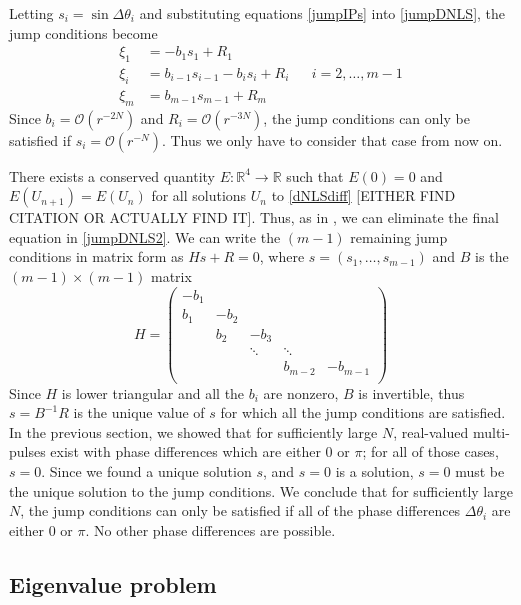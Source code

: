 \documentclass[12pt]{article}
\def\R{{\mathbb R}}
\begin{document}
Letting $s_i = \sin{\Delta\theta_i}$ and substituting equations \eqref{jumpIPs} into \eqref{jumpDNLS}, the jump conditions become
\begin{equation}\label{jumpDNLS2}
\begin{aligned}
\xi_1 &= -b_1 s_1 + R_1 \\
\xi_i &= b_{i-1} s_{i-1} - b_i s_i + R_i
&& i = 2, \dots, m-1 \\
\xi_m &= b_{m-1} s_{m-1} + R_m
\end{aligned}
\end{equation}
Since $b_i = \mathcal{O}(r^{-2N})$ and $R_i = \mathcal{O}(r^{-3N})$, the jump conditions can only be satisfied if $s_i = \mathcal{O}(r^{-N})$. Thus we only have to consider that case from now on. 
 
There exists a conserved quantity $E: \R^4 \rightarrow \R$ such that $E(0) = 0$ and $E(U_{n+1}) = E(U_n)$ for all solutions $U_n$ to \eqref{dNLSdiff} [EITHER FIND CITATION OR ACTUALLY FIND IT]. Thus, as in \cite{SandstedeStrut}, we can eliminate the final equation in \eqref{jumpDNLS2}. We can write the $(m-1)$ remaining jump conditions in matrix form as $H s + R = 0$, where $s = (s_1, \dots, s_{m-1})$ and $B$ is the $(m-1)\times(m-1)$ matrix
\[
H = \begin{pmatrix}
-b_1 \\
b_1 & -b_2 \\
& b_2 & -b_3 \\
&& \ddots & \ddots \\
&&& b_{m-2} & -b_{m-1} \\
\end{pmatrix}
\]
Since $H$ is lower triangular and all the $b_i$ are nonzero, $B$ is invertible, thus $s = B^{-1}R$ is the unique value of $s$ for which all the jump conditions are satisfied. In the previous section, we showed that for sufficiently large $N$, real-valued multi-pulses exist with phase differences which are either 0 or $\pi$; for all of those cases, $s = 0$. Since we found a unique solution $s$, and $s = 0$ is a solution, $s = 0$ must be the unique solution to the jump conditions. We conclude that for sufficiently large $N$, the jump conditions can only be satisfied if all of the phase differences $\Delta \theta_i$ are either 0 or $\pi$. No other phase differences are possible.

\subsection{Eigenvalue problem}
\end{document}
